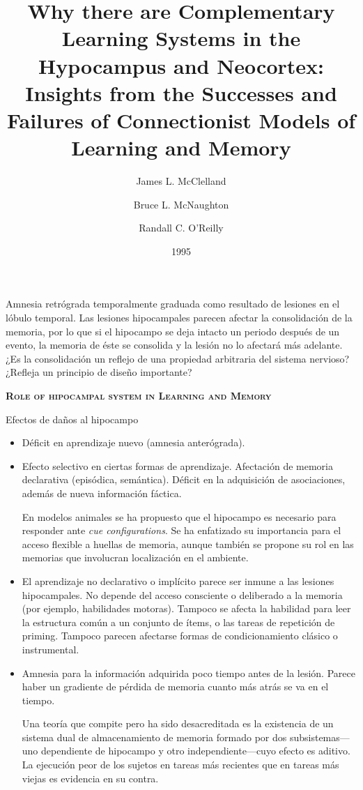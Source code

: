 \documentclass[a4paper,12pt]{article}
\title{Why there are Complementary Learning Systems in the Hypocampus and Neocortex: Insights from the Successes and Failures of Connectionist Models of Learning and Memory}
\author{James L. McClelland \and Bruce L. McNaughton \and Randall C. O'Reilly}
\date{1995}
\begin{document}
{\scshape\bfseries \maketitle}

Amnesia retrógrada temporalmente graduada como resultado de lesiones en el lóbulo temporal. Las lesiones hipocampales parecen afectar la consolidación de la memoria, por lo que si el hipocampo se deja intacto un periodo después de un evento, la memoria de éste se consolida y la lesión no lo afectará más adelante. ¿Es la consolidación un reflejo de una propiedad arbitraria del sistema nervioso? ¿Refleja un principio de diseño importante?

{\scshape\bfseries Role of hipocampal system in Learning and Memory}

Efectos de daños al hipocampo
\begin{itemize}
	\item Déficit en aprendizaje nuevo (amnesia anterógrada).
	\item Efecto selectivo en ciertas formas de aprendizaje. Afectación de memoria declarativa (episódica, semántica). Déficit en la adquisición de asociaciones, además de nueva información fáctica.

		En modelos animales se ha propuesto que el hipocampo es necesario para responder ante {\itshape cue configurations}. Se ha enfatizado su importancia para el acceso flexible a huellas de memoria, aunque también se propone su rol en las memorias que involucran localización en el ambiente. 
	\item El aprendizaje no declarativo o implícito parece ser inmune a las lesiones hipocampales. No depende del acceso consciente o deliberado a la memoria (por ejemplo, habilidades motoras). Tampoco se afecta la habilidad para leer la estructura común a un conjunto de ítems, o las tareas de repetición de priming. Tampoco parecen afectarse formas de condicionamiento clásico o instrumental.
	\item Amnesia para la información adquirida poco tiempo antes de la lesión. Parece haber un gradiente de pérdida de memoria cuanto más atrás se va en el tiempo.

		Una teoría que compite pero ha sido desacreditada es la existencia de un sistema dual de almacenamiento de memoria formado por dos subsistemas---uno dependiente de hipocampo y otro independiente---cuyo efecto es aditivo. La ejecución peor de los sujetos en tareas más recientes que en tareas más viejas es evidencia en su contra.
\end{itemize}
\end{document}

